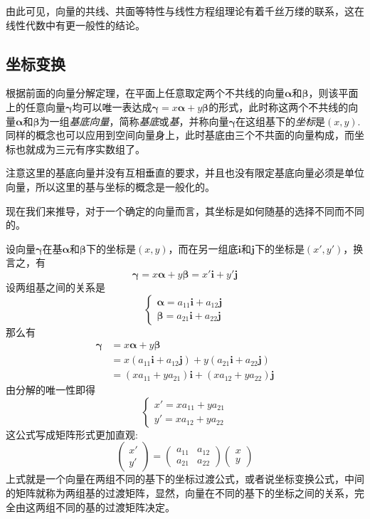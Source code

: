 由此可见，向量的共线、共面等特性与线性方程组理论有着千丝万缕的联系，这在线性代数中有更一般性的结论。

\subsection{坐标变换}
\label{sec:coordination-translation-of-vector}

根据前面的向量分解定理，在平面上任意取定两个不共线的向量$\bm{\alpha}$和$\bm{\beta}$，则该平面上的任意向量$\bm{\gamma}$均可以唯一表达成$\bm{\gamma}=x\bm{\alpha}+y\bm{\beta}$的形式，此时称这两个不共线的向量$\bm{\alpha}$和$\bm{\beta}$为一组\emph{基底向量}，简称\emph{基底}或\emph{基}，并称向量$\bm{\gamma}$在这组基下的\emph{坐标}是$(x,y)$. 同样的概念也可以应用到空间向量身上，此时基底由三个不共面的向量构成，而坐标也就成为三元有序实数组了。

注意这里的基底向量并没有互相垂直的要求，并且也没有限定基底向量必须是单位向量，所以这里的基与坐标的概念是一般化的。

现在我们来推导，对于一个确定的向量而言，其坐标是如何随基的选择不同而不同的。

设向量$\bm{\gamma}$在基$\bm{\alpha}$和$\bm{\beta}$下的坐标是$(x,y)$，而在另一组底$\bm{i}$和$\bm{j}$下的坐标是$(x',y')$，换言之，有
\[ \bm{\gamma}=x\bm{\alpha}+y\bm{\beta}=x'\bm{i}+y'\bm{j} \]
设两组基之间的关系是
\[
  \begin{cases}
    \bm{\alpha}=a_{11}\bm{i}+a_{12}\bm{j} \\
    \bm{\beta}=a_{21}\bm{i}+a_{22}\bm{j}
    \end{cases}
\]
那么有
\begin{align*}
  \bm{\gamma} & = x\bm{\alpha}+y\bm{\beta} \\
              & = x(a_{11}\bm{i}+a_{12}\bm{j})+y(a_{21}\bm{i}+a_{22}\bm{j})  \\
  & = (xa_{11}+ya_{21})\bm{i}+(xa_{12}+ya_{22})\bm{j}
\end{align*}
由分解的唯一性即得
\[
  \begin{cases}
    x' = xa_{11}+ya_{21} \\
    y' = xa_{12}+ya_{22}
  \end{cases}
  \]
  这公式写成矩阵形式更加直观:
  \[
    \begin{pmatrix}
      x' \\
      y'
    \end{pmatrix}
    =
    \begin{pmatrix}
      a_{11} & a_{12} \\
      a_{21} & a_{22}
    \end{pmatrix}
    \begin{pmatrix}
      x \\
      y
    \end{pmatrix}
  \]
  上式就是一个向量在两组不同的基下的坐标过渡公式，或者说坐标变换公式，中间的矩阵就称为两组基的过渡矩阵，显然，向量在不同的基下的坐标之间的关系，完全由这两组不同的基的过渡矩阵决定。

